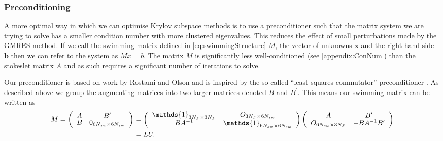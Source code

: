 \subsubsection{Preconditioning} \label{sec:Preconditioning}
A more optimal way in which we can optimise Krylov subspace methods is to use a preconditioner such that the matrix system we are trying to solve has a smaller condition number with more clustered eigenvalues. This reduces the effect of small perturbations made by the GMRES method. If we call the swimming matrix defined in \cref{eq:swimmingStructure} $M$, the vector of unknowns $\bm{x}$ and the right hand side $\bm{b}$ then we can refer to the system as $Mx=b$. The matrix $M$ is significantly less well-conditioned (see \cref{appendix:ConNum}) than the stokeslet matrix $A$ and as such requires a significant number of iterations to solve.

Our preconditioner is based on work by Rostami and Olson \cite{Rostami2019FastBiofluids} and is inspired by the so-called “least-squares commutator” preconditioner \cite{Elman2005FiniteDynamics}. As described above we group the augmenting matrices into two larger matrices denoted $B$ and $B^\prime$. This means our swimming matrix can be written as 
\begin{equation*}
\begin{aligned}
\def\arraystretch{0.8}
    M = \left(\begin{array}{cc}
        A & B^\prime \\
        B & 0_{6N_{sw}\times6N_{sw}} 
    \end{array}\right) &= 
    \left(\begin{array}{cc}
        \mathds{1}_{3N_F \times 3N_F} & O_{3N_F\times6N_{sw}} \\
        BA^{-1} & \mathds{1}_{6N_{sw} \times 6N_{sw}}
    \end{array}\right)
    \left(\begin{array}{cc}
        A & B^\prime \\
        O_{6N_{sw}\times3N_F} & -BA^{-1}B^\prime
    \end{array}\right) \\
    &= LU.
\end{aligned}
\end{equation*}

